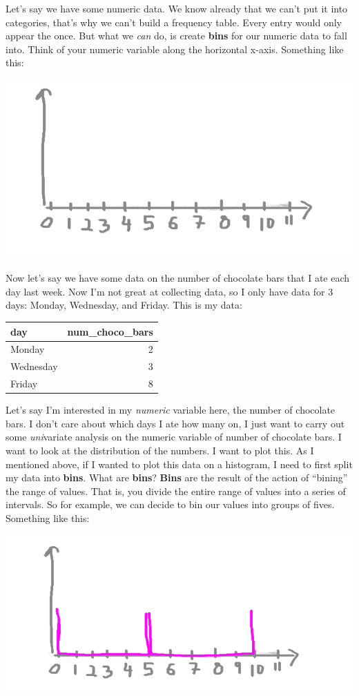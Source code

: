 \documentclass[
]{book}
\begin{document}
Let's say we have some numeric data. We know already that we can't put it into categories, that's why we can't build a frequency table. Every entry would only appear the once. But what we \emph{can} do, is create \textbf{bins} for our numeric data to fall into. Think of your numeric variable along the horizontal x-axis. Something like this:

\includegraphics{imgs/hist_blank_x.png}

Now let's say we have some data on the number of chocolate bars that I ate each day last week. Now I'm not great at collecting data, so I only have data for 3 days: Monday, Wednesday, and Friday. This is my data:

\begin{tabular}{l|r}
\hline
day & num\_choco\_bars\\
\hline
Monday & 2\\
\hline
Wednesday & 3\\
\hline
Friday & 8\\
\hline
\end{tabular}

Let's say I'm interested in my \emph{numeric} variable here, the number of chocolate bars. I don't care about which days I ate how many on, I just want to carry out some \emph{uni}variate analysis on the numeric variable of number of chocolate bars. I want to look at the distribution of the numbers. I want to plot this. As I mentioned above, if I wanted to plot this data on a histogram, I need to first split my data into \textbf{bins}. What are \textbf{bins}? \textbf{Bins} are the result of the action of ``bining'' the range of values. That is, you divide the entire range of values into a series of intervals. So for example, we can decide to bin our values into groups of fives. Something like this:

\includegraphics{imgs/hist_bins.png}
\end{document}
